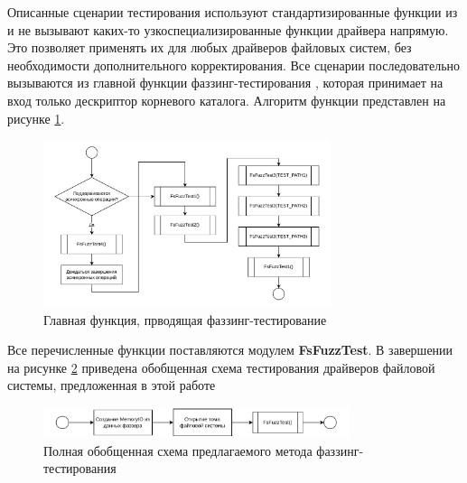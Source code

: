Описанные сценарии тестирования используют стандартизированные функции из  и не вызывают каких-то узкоспециализированные функции драйвера напрямую. Это позволяет применять их для любых драйверов файловых систем, без необходимости дополнительного корректирования. Все сценарии последовательно вызываются из главной функции фаззинг-тестирования , которая принимает на вход только дескриптор корневого каталога. Алгоритм функции представлен на рисунке \ref{met:pic:fsfuzztest}.
\begin{figure}[htbp]
	\centering %
	\includegraphics[width=0.75\textwidth]{FsFuzzTest.pdf} %
	\caption{Главная функция, прводящая фаззинг-тестирование } %
	\label{met:pic:fsfuzztest} %
\end{figure} 

Все перечисленные функции поставляются модулем \textbf{FsFuzzTest}. В завершении на рисунке \ref{met:pic:testscheme} приведена обобщенная схема тестирования драйверов файловой системы, предложенная в этой работе  
\begin{figure}[htbp]
	\centering %
	\includegraphics[width=0.8\textwidth]{TestScheme.pdf} %
	\caption{Полная обобщенная схема предлагаемого метода фаззинг-тестирования} %
	\label{met:pic:testscheme} %
\end{figure} 